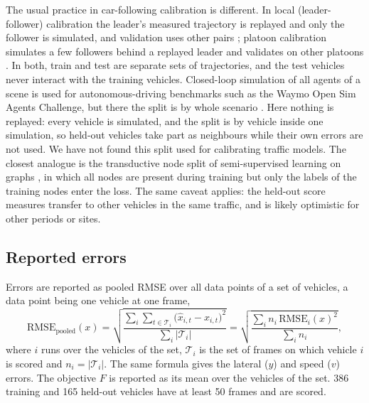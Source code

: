 \documentclass[11pt]{article}
\begin{document}
The usual practice in car-following calibration is different. In local
(leader-follower) calibration the leader's measured trajectory is replayed and
only the follower is simulated, and validation uses other pairs \cite{kt08};
platoon calibration simulates a few followers behind a replayed leader and
validates on other platoons \cite{kurtc16}. In both, train and test are
separate sets of trajectories, and the test vehicles never interact with the
training vehicles. Closed-loop simulation of all agents of a scene is used for
autonomous-driving benchmarks such as the Waymo Open Sim Agents Challenge, but
there the split is by whole scenario \cite{wosac23}. Here nothing is replayed:
every vehicle is simulated, and the split is by vehicle inside one simulation,
so held-out vehicles take part as neighbours while their own errors are not
used. We have not found this split used for calibrating traffic models. The
closest analogue is the transductive node split of semi-supervised learning on
graphs \cite{kipf17}, in which all nodes are present during training but only
the labels of the training nodes enter the loss. The same caveat applies: the
held-out score measures transfer to other vehicles in the same traffic, and is
likely optimistic for other periods or sites.

\subsection{Reported errors}
Errors are reported as pooled RMSE over all data points of a set of vehicles, a
data point being one vehicle at one frame,
\begin{equation}
\mathrm{RMSE}_{\mathrm{pooled}}(x)=\sqrt{\frac{\sum_{i}\sum_{t\in\mathcal T_i}\big(\hat x_{i,t}-x_{i,t}\big)^{2}}{\sum_{i}|\mathcal T_i|}}
=\sqrt{\frac{\sum_i n_i\,\mathrm{RMSE}_i(x)^{2}}{\sum_i n_i}},
\label{eq:pooled}
\end{equation}
where $i$ runs over the vehicles of the set, $\mathcal T_i$ is the set of
frames on which vehicle $i$ is scored and $n_i=|\mathcal T_i|$. The same
formula gives the lateral ($y$) and speed ($v$) errors. The objective $F$ is
reported as its mean over the vehicles of the set. 386 training and 165
held-out vehicles have at least 50 frames and are scored.
\end{document}
